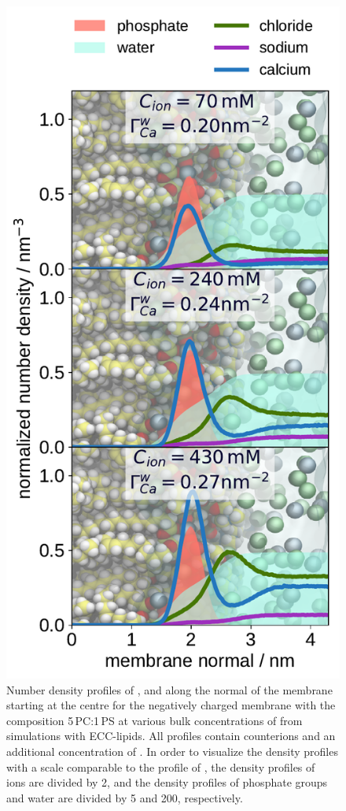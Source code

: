 \documentclass[12pt,a4paper,twoside,openright]{report}
\begin{document}
\begin{figure}[htbp!] 
  \centering 
  \includegraphics[width=\figwidth]{../img/ecc_pops/density_profiles_ca_na_cl_wat_phos_models-compar_1-3_CaCl2-series.pdf}
  \caption{\label{fig:cacl-dens_PCPS} 
    Number density profiles of ,  and  along the normal of the membrane starting at the centre
    for the negatively charged membrane with the composition 5\,PC:1\,PS
    at various bulk concentrations of  from simulations with ECC-lipids. 
    All profiles contain  counterions and an additional concentration of . 
    In order to visualize the density profiles with a scale comparable to the profile of ,  
    the density profiles of~ ions are divided by 2, and 
    the density profiles of phosphate groups and water are divided by 5 and 200, respectively.  
    } 
\end{figure} 
\end{document}
